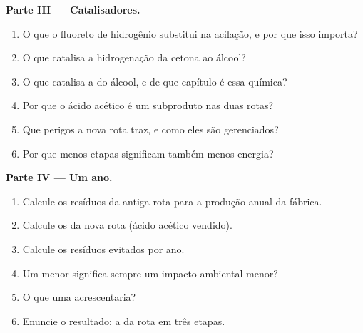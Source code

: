 \begin{problem}
\medskip\noindent\textbf{Parte III --- Catalisadores.}
\begin{enumerate}[resume]
  \item O que o fluoreto de hidrogênio substitui na acilação, e por que isso importa?
  \item O que catalisa a hidrogenação da cetona ao álcool?
  \item O que catalisa a  do álcool, e de que capítulo é essa química?
  \item Por que o ácido acético é um subproduto nas duas rotas?
  \item Que perigos a nova rota traz, e como eles são gerenciados?
  \item Por que menos etapas significam também menos energia?
\end{enumerate}

\medskip\noindent\textbf{Parte IV --- Um ano.}
\begin{enumerate}[resume]
  \item Calcule os resíduos da antiga rota para a produção anual da fábrica.
  \item Calcule os da nova rota (ácido acético vendido).
  \item Calcule os resíduos evitados por ano.
  \item Um  menor significa sempre um impacto ambiental menor?
  \item O que uma  acrescentaria?
  \item Enuncie o resultado: a  da rota em três etapas.
\end{enumerate}
\end{problem}

